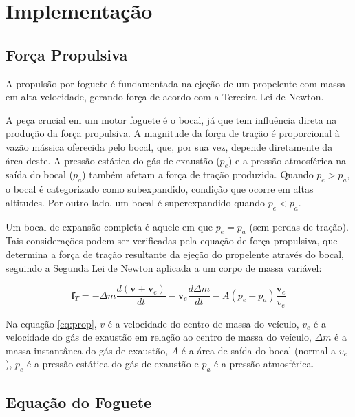 \chapter{Implementação}

\section{Força Propulsiva}

\par A propulsão por foguete é fundamentada na ejeção de um propelente com massa em alta velocidade, gerando força de acordo com a Terceira Lei de Newton.

\par A peça crucial em um motor foguete é o bocal, já que tem influência direta na produção da força propulsiva. A magnitude da força de tração é proporcional à vazão mássica oferecida pelo bocal, que, por sua vez, depende diretamente da área deste. A pressão estática do gás de exaustão ($p_e$) e a pressão atmosférica na saída do bocal ($p_a$) também afetam a força de tração produzida. Quando $p_e > p_a$, o bocal é categorizado como subexpandido, condição que ocorre em altas altitudes. Por outro lado, um bocal é superexpandido quando $p_e < p_a$. 

\par Um bocal de expansão completa é aquele em que $p_e = p_a$ (sem perdas de tração). Tais considerações podem ser verificadas pela equação de força propulsiva, que determina a força de tração resultante da ejeção do propelente através do bocal, seguindo a Segunda Lei de Newton aplicada a um corpo de massa variável:

\begin{equation}
\mathbf{f}_T=-\Delta m \frac{d\left(\mathbf{v}+\mathbf{v}_e\right)}{d t}-\mathbf{v}_e \frac{d \Delta m}{d t}-A\left(p_e-p_a\right) \frac{\mathbf{v}_e}{v_e}
\label{eq:prop}
\end{equation}

\par Na equação \ref{eq:prop}, $v$ é a velocidade do centro de massa do veículo, $v_e$ é a velocidade do gás de exaustão em relação ao centro de massa do veículo, $\Delta m$ é a massa instantânea do gás de exaustão, $A$ é a área de saída do bocal (normal a $v_e$), $p_e$ é a pressão estática do gás de exaustão e $p_a$ é a pressão atmosférica.

\section{Equação do Foguete}
\label{sectionfoguete}

